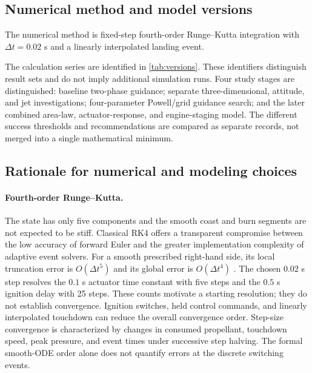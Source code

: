 \documentclass[11pt,a4paper]{article}
\begin{document}
\subsection{Numerical method and model versions}
The numerical method is fixed-step fourth-order Runge--Kutta integration with $\Delta t=0.02$ s and a linearly interpolated landing event.

The calculation series are identified in \cref{tab:versions}. These identifiers distinguish result sets and do not imply additional simulation runs. Four study stages are distinguished: baseline two-phase guidance; separate three-dimensional, attitude, and jet investigations; four-parameter Powell/grid guidance search; and the later combined area-law, actuator-response, and engine-staging model. The different success thresholds and recommendations are compared as separate records, not merged into a single mathematical minimum.


\subsection{Rationale for numerical and modeling choices}
\label{sec:rationale}
\paragraph{Fourth-order Runge--Kutta.}
The state has only five components and the smooth coast and burn segments are not expected to be stiff. Classical RK4 offers a transparent compromise between the low accuracy of forward Euler and the greater implementation complexity of adaptive event solvers. For a smooth prescribed right-hand side, its local truncation error is $O(\Delta t^5)$ and its global error is $O(\Delta t^4)$ \cite{hairer}. The chosen $0.02$ s step resolves the $0.1$ s actuator time constant with five steps and the $0.5$ s ignition delay with 25 steps. These counts motivate a starting resolution; they do not establish convergence. Ignition switches, held control commands, and linearly interpolated touchdown can reduce the overall convergence order. Step-size convergence is characterized by changes in consumed propellant, touchdown speed, peak pressure, and event times under successive step halving. The formal smooth-ODE order alone does not quantify errors at the discrete switching events.
\end{document}
